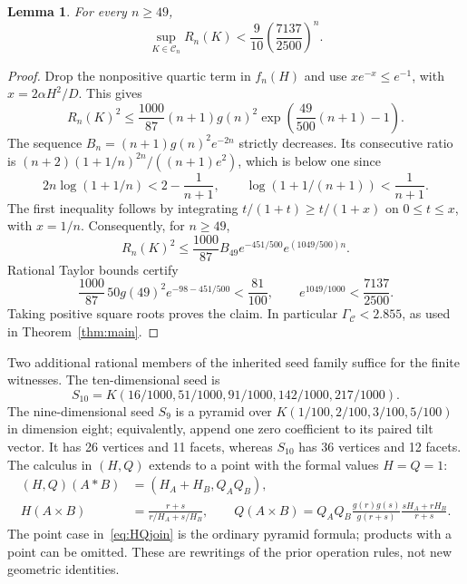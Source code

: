 \documentclass[11pt]{article}
\newtheorem{lemma}[theorem]{Lemma}
\newcommand{\CC}{\mathcal C}
\begin{document}
\begin{lemma}\label{lem:uniform-upper}
For every $n\ge49$,
\begin{equation}\label{eq:finite-upper}
 \sup_{K\in\CC_n}R_n(K)
 <\frac9{10}\left(\frac{7137}{2500}\right)^n.
\end{equation}
\end{lemma}
\begin{proof}
Drop the nonpositive quartic term in $f_n(H)$ and use
$x e^{-x}\le e^{-1}$, with $x=2\alpha H^2/D$. This gives
\[
 R_n(K)^2\le\frac{1000}{87}(n+1)g(n)^2
                  \exp\left(\frac{49}{500}(n+1)-1\right).
\]
The sequence $B_n=(n+1)g(n)^2e^{-2n}$ strictly decreases. Its consecutive
ratio is $(n+2)(1+1/n)^{2n}/((n+1)e^2)$, which is below one since
\[
 2n\log(1+1/n)<2-\frac1{n+1},\qquad
 \log(1+1/(n+1))<\frac1{n+1}.
\]
The first inequality follows by integrating
$t/(1+t)\ge t/(1+x)$ on $0\le t\le x$, with $x=1/n$.
Consequently, for $n\ge49$,
\[
 R_n(K)^2\le\frac{1000}{87}B_{49}
                  e^{-451/500}e^{(1049/500)n}.
\]
Rational Taylor bounds certify
\[
 \frac{1000}{87}\,50g(49)^2e^{-98-451/500}<\frac{81}{100},
 \qquad e^{1049/1000}<\frac{7137}{2500}.
\]
Taking positive square roots proves the claim. In particular
$\Gamma_{\CC}<2.855$, as used in Theorem~\ref{thm:main}.
\end{proof}

Two additional rational members of the inherited seed family suffice
for the finite witnesses. The ten-dimensional seed is
\[
 S_{10}=K(16/1000,51/1000,91/1000,142/1000,217/1000).
\]
The nine-dimensional seed $S_9$ is a pyramid over
$K(1/100,2/100,3/100,5/100)$ in dimension eight; equivalently, append one
zero coefficient to its paired tilt vector. It has 26 vertices and 11
facets, whereas $S_{10}$ has 36 vertices and 12 facets. The calculus in
$(H,Q)$ extends to a point with the formal values $H=Q=1$:
\begin{align}
 (H,Q)(A*B)&=(H_A+H_B,Q_AQ_B),\label{eq:HQjoin}\\
 H(A\times B)&=\frac{r+s}{r/H_A+s/H_B},\qquad
 Q(A\times B)=Q_AQ_B\frac{g(r)g(s)}{g(r+s)}
                            \frac{sH_A+rH_B}{r+s}.\label{eq:HQproduct}
\end{align}
The point case in~\eqref{eq:HQjoin} is the ordinary pyramid formula;
products with a point can be omitted. These are rewritings of the prior
operation rules, not new geometric identities.
\end{document}
